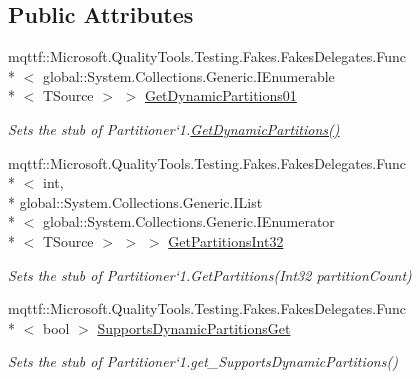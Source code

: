 \subsection*{Public Attributes}
\begin{DoxyCompactItemize}
\item 
mqttf\-::\-Microsoft.\-Quality\-Tools.\-Testing.\-Fakes.\-Fakes\-Delegates.\-Func\\*
$<$ global\-::\-System.\-Collections.\-Generic.\-I\-Enumerable\\*
$<$ T\-Source $>$ $>$ \hyperlink{class_system_1_1_collections_1_1_concurrent_1_1_fakes_1_1_stub_partitioner_3_01_t_source_01_4_a6521d1146acffb9e3bf5c4cfac8d53e0}{Get\-Dynamic\-Partitions01}
\begin{DoxyCompactList}\small\item\em Sets the stub of Partitioner`1.\hyperlink{class_system_1_1_collections_1_1_concurrent_1_1_fakes_1_1_stub_partitioner_3_01_t_source_01_4_a6732f39d910198eed65fa3b0d9d25af3}{Get\-Dynamic\-Partitions()}\end{DoxyCompactList}\item 
mqttf\-::\-Microsoft.\-Quality\-Tools.\-Testing.\-Fakes.\-Fakes\-Delegates.\-Func\\*
$<$ int, \\*
global\-::\-System.\-Collections.\-Generic.\-I\-List\\*
$<$ global\-::\-System.\-Collections.\-Generic.\-I\-Enumerator\\*
$<$ T\-Source $>$ $>$ $>$ \hyperlink{class_system_1_1_collections_1_1_concurrent_1_1_fakes_1_1_stub_partitioner_3_01_t_source_01_4_a1864ec285130bd00b85635682c51dfb4}{Get\-Partitions\-Int32}
\begin{DoxyCompactList}\small\item\em Sets the stub of Partitioner`1.Get\-Partitions(\-Int32 partition\-Count)\end{DoxyCompactList}\item 
mqttf\-::\-Microsoft.\-Quality\-Tools.\-Testing.\-Fakes.\-Fakes\-Delegates.\-Func\\*
$<$ bool $>$ \hyperlink{class_system_1_1_collections_1_1_concurrent_1_1_fakes_1_1_stub_partitioner_3_01_t_source_01_4_aa20b07041af2b3c4eb7c860739cac829}{Supports\-Dynamic\-Partitions\-Get}
\begin{DoxyCompactList}\small\item\em Sets the stub of Partitioner`1.get\-\_\-\-Supports\-Dynamic\-Partitions()\end{DoxyCompactList}\end{DoxyCompactItemize}
